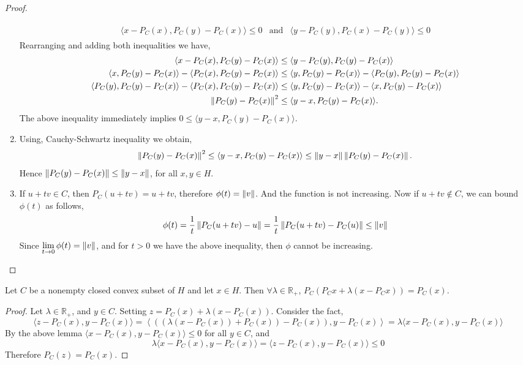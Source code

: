 \begin{lemma}
\begin{proof}
\begin{enumerate}
		\begin{align*}
			\begin{array}{ccc}
			\langle x-P_C(x), P_C(y)-P_C(x)\rangle \leq 0 & \text{and}
			&\langle y-P_C(y), P_C(x)-P_C(y)\rangle \leq 0
			\end{array}			
		\end{align*}
		Rearranging and adding both inequalities we have,
		\begin{align*}
		\langle x-P_C(x), P_C(y)-P_C(x)\rangle &\leq 
		\langle y-P_C(y), P_C(y)-P_C(x)\rangle \\
		\langle x, P_C(y)-P_C(x)\rangle -\langle P_C(x), P_C(y)-P_C(x)\rangle&\leq \langle y, P_C(y)-P_C(x)\rangle -\langle P_C(y), P_C(y)-P_C(x)\rangle \\
		\langle P_C(y), P_C(y)-P_C(x)\rangle -\langle P_C(x), P_C(y)-P_C(x)\rangle&\leq \langle y, P_C(y)-P_C(x)\rangle -\langle x, P_C(y)-P_C(x)\rangle \\
		\left\lVert P_C(y)-P_C(x)\right\rVert^2&\leq \langle y-x, P_C(y)-P_C(x)\rangle.
		\end{align*}
		The above inequality immediately implies $0\leq \langle y-x, P_C(y)-P_C(x)\rangle$.
		\item Using, Cauchy-Schwartz inequality we obtain,
		\begin{align*}
		\left\lVert P_C(y)-P_C(x)\right\rVert^2\leq \langle y-x, P_C(y)-P_C(x)\rangle\leq \left\lVert y-x\right\rVert \left\lVert P_C(y)-P_C(x)\right\rVert.
		\end{align*}
		Hence $\left\lVert P_C(y)-P_C(x)\right\rVert\leq \left\lVert y-x\right\rVert$, for all $x,y \in H$.
		\item If $u+tv \in C$, then $P_C(u+tv)=u+tv$, therefore $\phi(t)= \left\lVert v\right\rVert$. And the function is not increasing. Now if $u+tv \notin C$, we can bound $\phi(t)$ as follows,
		\[
			\phi(t)=\frac{1}{t}\left\lVert P_C(u+tv)-u\right\rVert=\frac{1}{t}\left\lVert P_C(u+tv)-P_C(u)\right\rVert \leq \left\lVert v\right\rVert
		\]
		Since $\underset{t\rightarrow 0}{\lim}\, \phi(t) = \left\lVert v\right\rVert$, and for $t>0$ we have the above inequality, then $\phi$ cannot be increasing.
	\end{enumerate}
\end{proof}
\end{lemma}
\begin{lemma}
	Let $C$ be a nonempty closed convex subset of $H$ and let $x\in H$. Then $\forall \lambda \in \mathbb{R}_+$, $P_C(P_Cx+\lambda (x-P_Cx))=P_C(x)$.
	
	\begin{proof}
		Let $\lambda \in \mathbb{R}_+$, and $y\in C$. Setting $z=P_C(x)+\lambda(x-P_C(x))$. Consider the fact, 
		\[
		\langle z-P_C(x), y-P_C(x)\rangle=\left\langle \left( (\lambda(x-P_C(x))+P_C(x)) - P_C(x)\right), y-P_C(x)\right\rangle = \lambda \langle x-P_C(x), y-P_C(x)\rangle	
		\] 
		By the above lemma $\langle x-P_C(x), y-P_C(x)\rangle \leq 0$ for all $y\in C$, and
		\[
			\lambda\langle x-P_C(x), y-P_C(x)\rangle=\langle z-P_C(x), y-P_C(x)\rangle \leq 0
		\]
		Therefore $P_C(z)=P_C(x)$.
	\end{proof}
\end{lemma}

